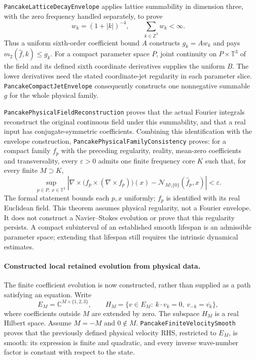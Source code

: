 \documentclass[11pt]{article}
\theoremstyle{definition}
\begin{document}
\texttt{PancakeLatticeDecayEnvelope} applies lattice summability in
dimension three, with the zero frequency handled separately, to prove
\[
 w_k=(1+|k|)^{-4},\qquad \sum_{k\in\mathbb Z^3}w_k<\infty.
\]
Thus a uniform sixth-order coefficient bound $A$ constructs
$g_k=Aw_k$ and pays $m_2(\widehat f,k)\le g_k$.
For a compact parameter space $P$, joint continuity on
$P\times\mathbb T^3$ of the field and its defined sixth coordinate
derivatives supplies the uniform $B$. The lower derivatives need the
stated coordinate-jet regularity in each parameter slice.
\texttt{PancakeCompactJetEnvelope} consequently constructs one
nonnegative summable $g$ for the whole physical family.

\texttt{PancakePhysicalFieldReconstruction} proves that the actual Fourier
integrals reconstruct the original continuous field under this
summability, and that a real input has conjugate-symmetric coefficients.
Combining this identification with the envelope construction,
\texttt{PancakePhysicalFamilyConsistency} proves: for a compact family
$f_p$ with the preceding regularity, reality, mean-zero coefficients and
transversality, every $\varepsilon>0$ admits one finite frequency core
$K$ such that, for every finite $M\supset K$,
\[
 \sup_{p\in P,\ x\in\mathbb T^3}
 \left|\nabla\times\bigl(f_p\times(\nabla\times f_p)\bigr)(x)
       -\mathcal N_{M\setminus\{0\}}(\widehat f_p,x)\right|
 <\varepsilon .
\]
The formal statement bounds each $p,x$ uniformly; $f_p$ is identified
with its real Euclidean field. This theorem assumes physical regularity,
not a Fourier envelope. It does not construct a Navier--Stokes evolution
or prove that this regularity persists. A compact subinterval of an
established smooth lifespan is an admissible parameter space; extending
that lifespan still requires the intrinsic dynamical estimates.

\paragraph{Constructed local retained evolution from physical data.}
The finite coefficient evolution is now constructed, rather than supplied
as a path satisfying an equation. Write
\[
 E_M=\mathbb C^{M\times\{1,2,3\}},\qquad
 H_M=\{v\in E_M:\ k\cdot v_k=0,\ v_{-k}=\overline{v_k}\},
\]
where coefficients outside $M$ are extended by zero. The subspace $H_M$
is a real Hilbert space. Assume $M=-M$ and $0\notin M$.
\texttt{PancakeFiniteVelocitySmooth} proves that the previously defined
physical velocity RHS, restricted to $E_M$, is smooth: its expression is
finite and quadratic, and every inverse wave-number factor is constant
with respect to the state.
\end{document}
